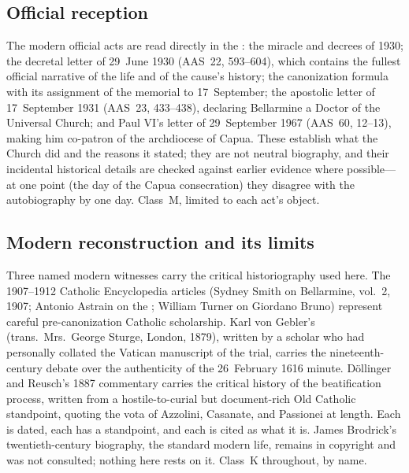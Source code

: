 \subsection{Official reception}

The modern official acts are read directly in the : the miracle and  decrees of 1930; the
decretal letter  of 29~June 1930 (AAS~22, 593--604),
which contains the fullest official narrative of the life and of the
cause's history; the canonization formula with its assignment of the
memorial to 17~September; the apostolic letter  of 17~September 1931 (AAS~23, 433--438), declaring Bellarmine a
Doctor of the Universal Church; and Paul VI's letter  of 29~September 1967 (AAS~60, 12--13), making him co-patron
of the archdiocese of Capua. These establish what the Church did and
the reasons it stated; they are not neutral biography, and their
incidental historical details are checked against earlier evidence
where possible---at one point (the day of the Capua consecration)
they disagree with the autobiography by one day. Class~M, limited to
each act's object.

\subsection{Modern reconstruction and its limits}

Three named modern witnesses carry the critical historiography used
here. The 1907--1912 Catholic Encyclopedia articles (Sydney Smith on
Bellarmine, vol.~2, 1907; Antonio Astrain on the ; William Turner on Giordano Bruno) represent careful
pre-canonization Catholic scholarship. Karl von Gebler's  (trans.\ Mrs.~George Sturge, London,
1879), written by a scholar who had personally collated the Vatican
manuscript of the trial, carries the nineteenth-century debate over
the authenticity of the 26~February 1616 minute. D\"ollinger and
Reusch's 1887 commentary carries the critical history of the
beatification process, written from a hostile-to-curial but
document-rich Old Catholic standpoint, quoting the vota of Azzolini,
Casanate, and Passionei at length. Each is dated, each has a
standpoint, and each is cited as what it is. James Brodrick's
twentieth-century biography, the standard modern life, remains in
copyright and was not consulted; nothing here rests on it. Class~K
throughout, by name.

